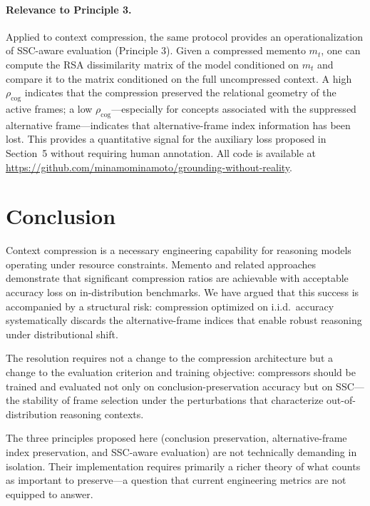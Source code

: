 \documentclass[12pt]{article}
\begin{document}
\paragraph{Relevance to Principle 3.}
Applied to context compression, the same protocol provides
an operationalization of SSC-aware evaluation (Principle 3).
Given a compressed memento $m_t$, one can compute the RSA
dissimilarity matrix of the model conditioned on $m_t$
and compare it to the matrix conditioned on the full
uncompressed context.
A high $\rho_\mathrm{cog}$ indicates that the compression
preserved the relational geometry of the active frames;
a low $\rho_\mathrm{cog}$---especially for concepts
associated with the suppressed alternative frame---indicates
that alternative-frame index information has been lost.
This provides a quantitative signal for the auxiliary loss
proposed in Section~5 without requiring human annotation.
All code is available at
\url{https://github.com/minamominamoto/grounding-without-reality}.

\section{Conclusion}

Context compression is a necessary engineering capability for reasoning
models operating under resource constraints. Memento and related approaches
demonstrate that significant compression ratios are achievable with
acceptable accuracy loss on in-distribution benchmarks. We have argued
that this success is accompanied by a structural risk: compression
optimized on i.i.d.\ accuracy systematically discards the alternative-frame
indices that enable robust reasoning under distributional shift.

The resolution requires not a change to the compression architecture but
a change to the evaluation criterion and training objective: compressors
should be trained and evaluated not only on conclusion-preservation accuracy
but on SSC---the stability of frame selection under the perturbations that
characterize out-of-distribution reasoning contexts.

The three principles proposed here (conclusion preservation, alternative-frame
index preservation, and SSC-aware evaluation) are not technically demanding
in isolation. Their implementation requires primarily a richer theory of
what counts as important to preserve---a question that current engineering
metrics are not equipped to answer.
\end{document}
